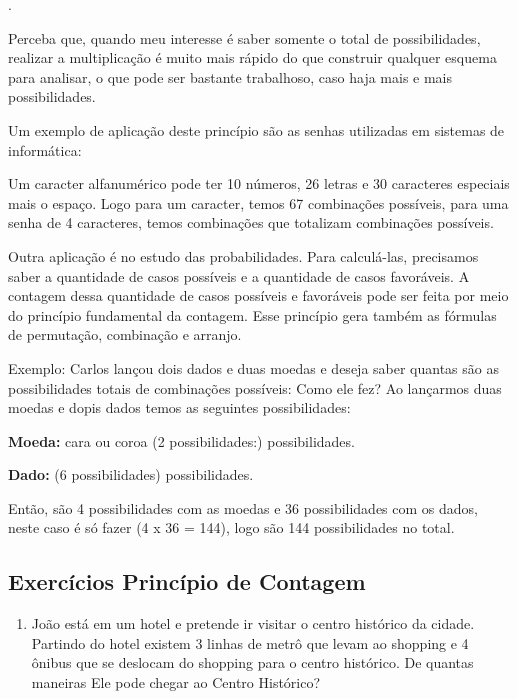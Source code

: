 \begin{multicols*}{2}
.

Perceba que, quando meu interesse é saber somente o total de possibilidades, realizar a multiplicação é muito mais rápido do que construir qualquer esquema para analisar, o que pode ser bastante trabalhoso, caso haja mais e mais possibilidades.

Um exemplo de aplicação deste princípio são as senhas utilizadas em sistemas de informática:

Um caracter alfanumérico pode ter 10 números, 26 letras e 30 caracteres especiais mais o espaço. Logo para um caracter, temos 67 combinações possíveis, para uma senha de 4 caracteres, temos  combinações que totalizam   combinações possíveis. 

Outra aplicação é no estudo das probabilidades. Para calculá-las, precisamos saber a quantidade de casos possíveis e a quantidade de casos favoráveis. A contagem dessa quantidade de casos possíveis e favoráveis pode ser feita por meio do princípio fundamental da contagem. Esse princípio gera também as fórmulas de permutação, combinação e arranjo.
	
Exemplo: Carlos lançou dois dados e duas moedas e deseja saber quantas são as possibilidades totais de combinações possíveis: Como ele fez?
Ao lançarmos duas moedas e dopis dados temos as seguintes possibilidades:

\textbf{Moeda:} cara ou coroa (2 possibilidades:)   possibilidades.

\textbf{Dado:}  (6 possibilidades)  possibilidades.

Então, são 4 possibilidades com as moedas e 36 possibilidades com os dados, neste caso é só fazer (4 x 36 = 144), logo são 144 possibilidades no total. 

	\subsection{Exercícios Princípio de Contagem}
	
	\begin{enumerate}
	
	\item João está em um hotel e pretende ir visitar o centro histórico da cidade. Partindo do hotel existem 3 linhas de metrô que levam ao shopping e 4 ônibus que se deslocam do shopping para o centro histórico. De quantas maneiras Ele pode chegar ao Centro Histórico?
	

\end{enumerate}
\end{multicols*}
